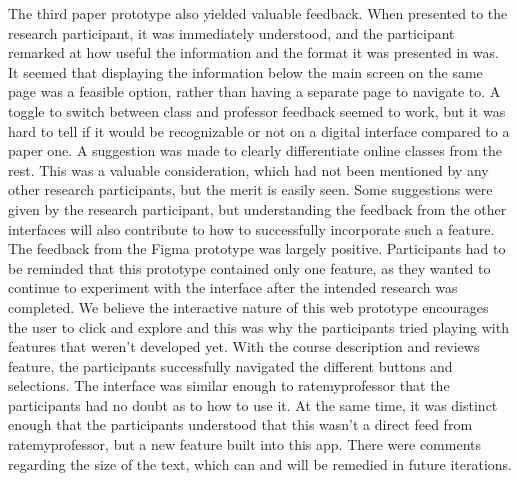 \documentclass{article}
\begin{document}
\newline
\newline
The third paper prototype also yielded valuable feedback. When presented to the research participant, it was immediately understood, and the participant remarked at how useful the information and the format it was presented in was. It seemed that displaying the information below the main screen on the same page was a feasible option, rather than having a separate page to navigate to. A toggle to switch between class and professor feedback seemed to work, but it was hard to tell if it would be recognizable or not on a digital interface compared to a paper one. A suggestion was made to clearly differentiate online classes from the rest. This was a valuable consideration, which had not been mentioned by any other research participants, but the merit is easily seen. Some suggestions were given by the research participant, but understanding the feedback from the other interfaces will also contribute to how to successfully incorporate such a feature.
\newline
\newline
The feedback from the Figma prototype was largely positive. Participants had to be reminded that this prototype contained only one feature, as they wanted to continue to experiment with the interface after the intended research was completed. We believe the interactive nature of this web prototype encourages the user to click and explore and this was why the participants tried playing with features that weren't developed yet. With the course description and reviews feature, the participants successfully navigated the different buttons and selections. The interface was similar enough to ratemyprofessor that the participants had no doubt as to how to use it. At the same time, it was distinct enough that the participants understood that this wasn't a direct feed from ratemyprofessor, but a new feature built into this app. There were comments regarding the size of the text, which can and will be remedied in future iterations.
\end{document}
